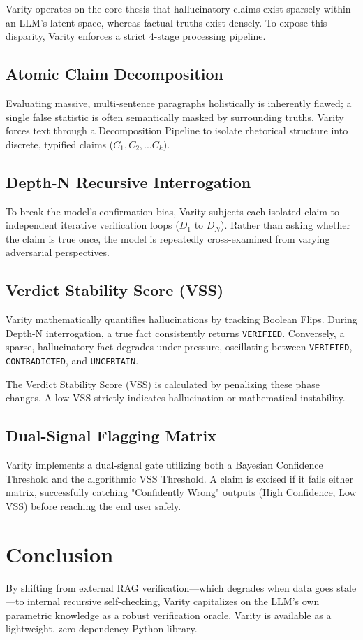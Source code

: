 \documentclass[10pt,twocolumn,letterpaper]{article}
\begin{document}
Varity operates on the core thesis that hallucinatory claims exist sparsely within an LLM's latent space, whereas factual truths exist densely. To expose this disparity, Varity enforces a strict 4-stage processing pipeline.

\subsection{Atomic Claim Decomposition}
Evaluating massive, multi-sentence paragraphs holistically is inherently flawed; a single false statistic is often semantically masked by surrounding truths. Varity forces text through a Decomposition Pipeline to isolate rhetorical structure into discrete, typified claims ($C_1, C_2, ... C_k$). 

\subsection{Depth-N Recursive Interrogation}
To break the model's confirmation bias, Varity subjects each isolated claim to independent iterative verification loops ($D_1$ to $D_N$). Rather than asking whether the claim is true once, the model is repeatedly cross-examined from varying adversarial perspectives.

\subsection{Verdict Stability Score (VSS)}
Varity mathematically quantifies hallucinations by tracking Boolean Flips. During Depth-N interrogation, a true fact consistently returns \texttt{VERIFIED}. Conversely, a sparse, hallucinatory fact degrades under pressure, oscillating between \texttt{VERIFIED}, \texttt{CONTRADICTED}, and \texttt{UNCERTAIN}. 

The Verdict Stability Score (VSS) is calculated by penalizing these phase changes. A low VSS strictly indicates hallucination or mathematical instability.

\subsection{Dual-Signal Flagging Matrix}
Varity implements a dual-signal gate utilizing both a Bayesian Confidence Threshold and the algorithmic VSS Threshold. A claim is excised if it fails either matrix, successfully catching "Confidently Wrong" outputs (High Confidence, Low VSS) before reaching the end user safely.

\section{Conclusion}
By shifting from external RAG verification—which degrades when data goes stale—to internal recursive self-checking, Varity capitalizes on the LLM's own parametric knowledge as a robust verification oracle. Varity is available as a lightweight, zero-dependency Python library.

{\small


}
\end{document}
